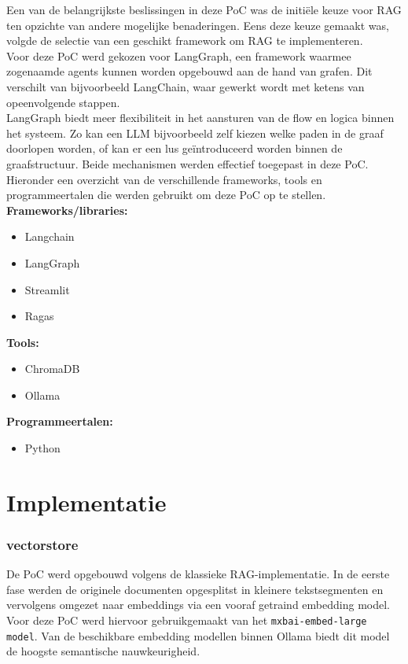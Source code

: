 Een van de belangrijkste beslissingen in deze PoC was de initiële keuze voor RAG ten opzichte van andere mogelijke benaderingen. Eens deze keuze gemaakt was, volgde de selectie van een geschikt framework om RAG te implementeren.
\\[1em]
Voor deze PoC werd gekozen voor LangGraph, een framework waarmee zogenaamde agents kunnen worden opgebouwd aan de hand van grafen. Dit verschilt van bijvoorbeeld LangChain, waar gewerkt wordt met ketens van opeenvolgende stappen.
\\[1em]
LangGraph biedt meer flexibiliteit in het aansturen van de flow en logica binnen het systeem. Zo kan een LLM bijvoorbeeld zelf kiezen welke paden in de graaf doorlopen worden, of kan er een lus geïntroduceerd worden binnen de graafstructuur. Beide mechanismen werden effectief toegepast in deze PoC.
\\[1em]
Hieronder een overzicht van de verschillende frameworks, tools en programmeertalen die werden gebruikt om deze PoC op te stellen.
\\[1em]
\textbf{Frameworks/libraries:}
\begin{itemize}
    \item Langchain
    \item LangGraph
    \item Streamlit
    \item Ragas
\end{itemize}

\textbf{Tools:}
\begin{itemize}
    \item ChromaDB
    \item Ollama
\end{itemize}

\textbf{Programmeertalen:}
\begin{itemize}
    \item Python
\end{itemize}


\section{Implementatie}

\subsubsection{vectorstore}
De PoC werd opgebouwd volgens de klassieke RAG-implementatie. In de eerste fase werden de originele documenten opgesplitst in kleinere tekstsegmenten en vervolgens omgezet naar embeddings via een vooraf getraind embedding model. Voor deze PoC werd hiervoor gebruikgemaakt van het \verb|mxbai-embed-large model|. Van de beschikbare embedding modellen binnen Ollama biedt dit model de hoogste semantische nauwkeurigheid.

